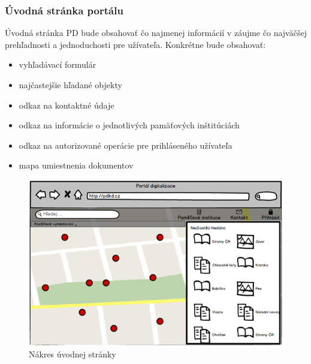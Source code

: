 \documentclass[
  print, %
  table,   %
  lof,     %
  nolot,     %
]{fithesis3}
\begin{document}
\subsubsection{Úvodná stránka portálu}
Úvodná stránka PD bude obsahovať čo najmenej informácií v záujme čo najväčšej prehľadnosti a jednoduchosti pre užívateľa. Konkrétne bude obsahovať:
\begin{itemize}
	\item vyhľadávací formulár
	\item najčastejšie hľadané objekty
	\item odkaz na kontaktné údaje
	\item odkaz na informácie o jednotlivých pamäťových inštitúciách
	\item odkaz na autorizované operácie pre prihláseného užívateľa
	\item mapa umiestnenia dokumentov
\end{itemize}
\begin{figure}[H]
	\centering
		\includegraphics[width=\textwidth]{fithesis/mockup/welcome.png}	
	\caption{Nákres úvodnej stránky}
	\label{mockup-welcome}
\end{figure}
\end{document}

